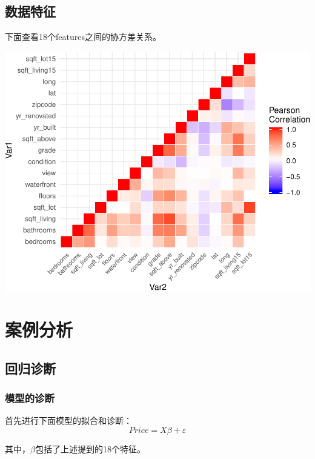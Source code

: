 \documentclass[]{article}
\begin{document}
\subsection{数据特征}

下面查看18个features之间的协方差关系。


\includegraphics{FinalProjectForRegressionAnalysis_files/figure-latex/unnamed-chunk-8-1.pdf}






%


\section{案例分析}




%
\subsection{回归诊断}

\subsubsection{模型的诊断}

首先进行下面模型的拟合和诊断： \[
Price = X\beta  + \varepsilon
\]

其中，\(\beta\)包括了上述提到的18个特征。
\end{document}
